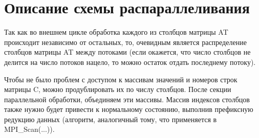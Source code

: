 \documentclass{report}
\begin{document}
	\section*{Описание схемы распараллеливания}
		\par Так как во внешнем цикле обработка каждого из столбцов матрицы AT происходит независимо от остальных, то, очевидным является распределение столбцов матрицы AT между потоками (если окажется, что число столбцов не делится на число потоков нацело, то можно остаток отдать последнему потоку).
		\par Чтобы не было проблем с доступом к массивам значений и номеров строк матрицы C, можно продублировать их по числу столбцов. После секции параллельной обработки, объединяем эти массивы. Массив индексов столбцов также нужно будет привести к нормальному состоянию, выполнив префиксную редукцию данных (алгоритм, аналогичный тому, что применяется в MPI\_Scan(...)).
	\newpage


\end{document}
